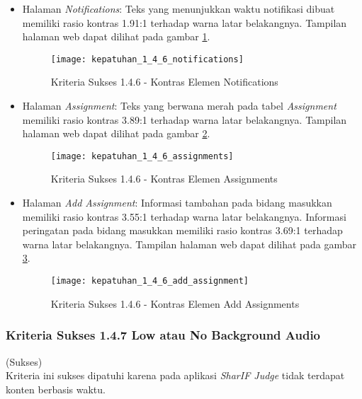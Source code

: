 \begin{itemize}
	\item Halaman \textit{Notifications}: Teks yang menunjukkan waktu notifikasi dibuat memiliki rasio kontras 1.91:1 terhadap warna latar belakangnya. Tampilan halaman web dapat dilihat pada gambar \ref{fig:kepatuhan_1_4_6_notifications}.
	\begin{figure}[H]
		\centering  
		\texttt{[image: kepatuhan\_1\_4\_6\_notifications]}  
		\caption[Kriteria Sukses 1.4.6 - Kontras Elemen Notifications]{Kriteria Sukses 1.4.6 - Kontras Elemen Notifications} 
		\label{fig:kepatuhan_1_4_6_notifications} 
	\end{figure}

	\item Halaman \textit{Assignment}: Teks yang berwana merah pada tabel \textit{Assignment} memiliki rasio kontras 3.89:1 terhadap warna latar belakangnya. Tampilan halaman web dapat dilihat pada gambar \ref{fig:kepatuhan_1_4_6_assignments}.
	\begin{figure}[H]
		\centering  
		\texttt{[image: kepatuhan\_1\_4\_6\_assignments]}  
		\caption[Kriteria Sukses 1.4.6 - Kontras Elemen Assignments]{Kriteria Sukses 1.4.6 - Kontras Elemen Assignments} 
		\label{fig:kepatuhan_1_4_6_assignments} 
	\end{figure}

	\item Halaman \textit{Add Assignment}: Informasi tambahan pada bidang masukkan memiliki rasio kontras 3.55:1 terhadap warna latar belakangnya. Informasi peringatan pada bidang masukkan memiliki rasio kontras 3.69:1 terhadap warna latar belakangnya. Tampilan halaman web dapat dilihat pada gambar \ref{fig:kepatuhan_1_4_6_add_assignment}.
	\begin{figure}[H]
		\centering  
		\texttt{[image: kepatuhan\_1\_4\_6\_add\_assignment]}  
		\caption[Kriteria Sukses 1.4.6 - Kontras Elemen Add Assignments]{Kriteria Sukses 1.4.6 - Kontras Elemen Add Assignments} 
		\label{fig:kepatuhan_1_4_6_add_assignment} 
	\end{figure}

\end{itemize}

\subsubsection{Kriteria Sukses 1.4.7 Low atau No Background Audio}
\label{subsubsec:kepatuhan_kriteria_1.4.7}
(Sukses) \\

Kriteria ini sukses dipatuhi karena pada aplikasi \textit{SharIF Judge} tidak terdapat konten berbasis waktu.


